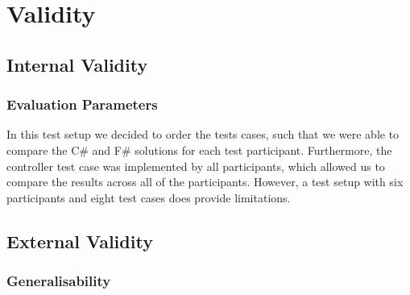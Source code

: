 \section{Validity}

\subsection{Internal Validity}

\subsubsection{Evaluation Parameters}
In this test setup we decided to order the tests cases, such that we were able to compare the C\# and F\# solutions for each test participant. Furthermore, the controller test case was implemented by all participants, which allowed us to compare the results across all of the participants. However, a test setup with six participants and eight test cases does provide limitations. 

\subsection{External Validity}


\subsubsection{Generalisability}
